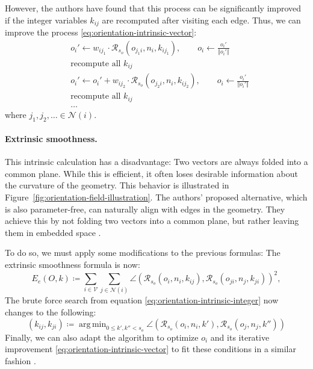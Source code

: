\documentclass{ACGSeminar}
\DeclareMathOperator*{\argmin}{arg\,min}
\begin{document}
However, the authors have found that this process can be significantly improved if the integer variables $k_{ij}$ are recomputed after visiting each edge. Thus, we can improve the process \eqref{eq:orientation-intrinsic-vector}:
\begin{equation}
\begin{split}
	& o_i' \leftarrow w_{ij_1} \cdot \mathcal{R}_{s_o}(o_{j_1i}, n_i, k_{ij_1}), \qquad o_i \leftarrow \frac{o_i'}{\Vert o_i' \Vert}\\
	& \textrm{recompute all } k_{ij}\\
	& o_i' \leftarrow o_i' + w_{ij_2} \cdot \mathcal{R}_{s_o}(o_{j_2i}, n_i, k_{ij_2}), \qquad o_i \leftarrow \frac{o_i'}{\Vert o_i' \Vert}\\
	& \textrm{recompute all } k_{ij}\\
	& \dots
\end{split}
\end{equation}
where $j_1, j_2, \dots \in \mathcal{N}(i)$.

\paragraph{Extrinsic smoothness.}
This intrinsic calculation has a disadvantage: Two vectors are always folded into a common plane. While this is efficient, it often loses desirable information about the curvature of the geometry. This behavior is illustrated in Figure~\ref{fig:orientation-field-illustration}. The authors' proposed alternative, which is also parameter-free, can naturally align with edges in the geometry. They achieve this by not folding two vectors into a common plane, but rather leaving them in embedded space \cite{jakob2015instant}.\bigskip

To do so, we must apply some modifications to the previous formulas:
The extrinsic smoothness formula is now:
\begin{equation}\label{eq:orientation-extrinsic-energy}
	E_e(O,k) \coloneqq \sum_{i \in \mathcal{V}} \sum_{j \in \mathcal{N}(i)} \angle(\mathcal{R}_{s_o}(o_{i}, n_i, k_{ij}), \mathcal{R}_{s_o}(o_{ji}, n_j, k_{ji}))^2,
\end{equation}
The brute force search from equation \eqref{eq:orientation-intrinsic-integer} now changes to the following:
\begin{equation}\label{eq:orientation-extrinsic-integer}
	(k_{ij}, k_{ji}) \coloneqq \argmin_{0 \leq k',k'' < s_o} \angle(\mathcal{R}_{s_o}(o_i, n_i, k'), \mathcal{R}_{s_o}(o_j, n_j, k''))
\end{equation}
Finally, we can also adapt the algorithm to optimize $o_i$ and its iterative improvement \eqref{eq:orientation-intrinsic-vector} to fit these conditions in a similar fashion \cite{jakob2015instant}.
\end{document}
